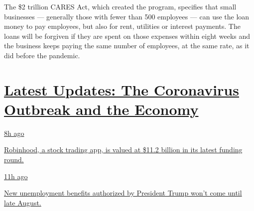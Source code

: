 The \$2 trillion CARES Act, which created the program, specifies that
small businesses --- generally those with fewer than 500 employees ---
can use the loan money to pay employees, but also for rent, utilities or
interest payments. The loans will be forgiven if they are spent on those
expenses within eight weeks and the business keeps paying the same
number of employees, at the same rate, as it did before the pandemic.

\hypertarget{latest-updates-the-coronavirus-outbreak-and-the-economy}{%
\section{\texorpdfstring{\href{https://www.nytimes3xbfgragh.onion/live/2020/08/17/business/stock-market-today-coronavirus?action=click\&pgtype=Article\&state=default\&region=MAIN_CONTENT_1\&context=storylines_live_updates}{Latest
Updates: The Coronavirus Outbreak and the
Economy}}{Latest Updates: The Coronavirus Outbreak and the Economy}}\label{latest-updates-the-coronavirus-outbreak-and-the-economy}}

\href{https://www.nytimes3xbfgragh.onion/live/2020/08/17/business/stock-market-today-coronavirus?action=click\&pgtype=Article\&state=default\&region=MAIN_CONTENT_1\&context=storylines_live_updates\#robinhood-a-stock-trading-app-is-valued-at-11-2-billion-in-its-latest-funding-round}{8h
ago}

\href{https://www.nytimes3xbfgragh.onion/live/2020/08/17/business/stock-market-today-coronavirus?action=click\&pgtype=Article\&state=default\&region=MAIN_CONTENT_1\&context=storylines_live_updates\#robinhood-a-stock-trading-app-is-valued-at-11-2-billion-in-its-latest-funding-round}{Robinhood,
a stock trading app, is valued at \$11.2 billion in its latest funding
round.}

\href{https://www.nytimes3xbfgragh.onion/live/2020/08/17/business/stock-market-today-coronavirus?action=click\&pgtype=Article\&state=default\&region=MAIN_CONTENT_1\&context=storylines_live_updates\#new-unemployment-benefits-authorized-by-president-trump-wont-come-until-late-august}{11h
ago}

\href{https://www.nytimes3xbfgragh.onion/live/2020/08/17/business/stock-market-today-coronavirus?action=click\&pgtype=Article\&state=default\&region=MAIN_CONTENT_1\&context=storylines_live_updates\#new-unemployment-benefits-authorized-by-president-trump-wont-come-until-late-august}{New
unemployment benefits authorized by President Trump won't come until
late August.}

